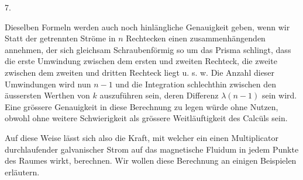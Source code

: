\clearpage\begingroup
{}
\begin{center}7.\end{center}
\noindent\hspace*{\parindent}Dieselben Formeln werden auch noch hinlängliche Genauigkeit geben, wenn wir Statt der getrennten Ströme in $n$ Rechtecken einen zusammenhängenden annehmen, der sich gleichsam Schraubenförmig so um das Prisma schlingt, dass die erste Umwindung zwischen dem ersten und zweiten
\clearpage{}
\noindent Rechteck, die zweite zwischen dem zweiten und dritten Rechteck liegt u. s. w. Die Anzahl dieser Umwindungen wird nun $n-1$ und die Integration schlechthin zwischen den äussersten Werthen von $k$ auszuführen sein, deren Differenz $\lambda(n-1)$ sein wird. Eine grössere Genauigkeit in diese Berechnung zu legen würde ohne Nutzen, obwohl ohne weitere Schwierigkeit als grössere Weitläuftigkeit des Calcüls sein.

Auf diese Weise lässt sich also die Kraft, mit welcher ein einen Multiplicator durchlaufender galvanischer Strom auf das magnetische Fluidum in jedem Punkte des Raumes wirkt, berechnen. Wir wollen diese Berechnung an einigen Beispielen erläutern.
\clearpage\endgroup
